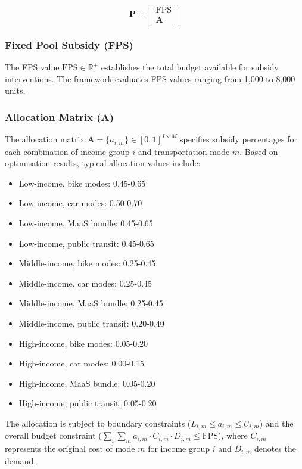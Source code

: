 \begin{equation}
\mathbf{P} = \begin{bmatrix} \text{FPS} \\ \mathbf{A} \end{bmatrix}
\end{equation}

\subsubsection{Fixed Pool Subsidy (FPS)}
The FPS value $\text{FPS} \in \mathbb{R}^+$ establishes the total budget available for subsidy interventions. The framework evaluates FPS values ranging from 1,000 to 8,000 units.

\subsubsection{Allocation Matrix \texorpdfstring{($\mathbf{A}$)}{(A)}}
The allocation matrix $\mathbf{A} = \{a_{i,m}\} \in [0,1]^{I \times M}$ specifies subsidy percentages for each combination of income group $i$ and transportation mode $m$. Based on optimisation results, typical allocation values include:

\begin{itemize}
    \item Low-income, bike modes: 0.45-0.65
    \item Low-income, car modes: 0.50-0.70
    \item Low-income, MaaS bundle: 0.45-0.65
    \item Low-income, public transit: 0.45-0.65
    \item Middle-income, bike modes: 0.25-0.45
    \item Middle-income, car modes: 0.25-0.45
    \item Middle-income, MaaS bundle: 0.25-0.45
    \item Middle-income, public transit: 0.20-0.40
    \item High-income, bike modes: 0.05-0.20
    \item High-income, car modes: 0.00-0.15
    \item High-income, MaaS bundle: 0.05-0.20
    \item High-income, public transit: 0.05-0.20
\end{itemize}

The allocation is subject to boundary constraints ($L_{i,m} \leq a_{i,m} \leq U_{i,m}$) and the overall budget constraint ($\sum_{i}\sum_{m}a_{i,m} \cdot C_{i,m} \cdot D_{i,m} \leq \text{FPS}$), where $C_{i,m}$ represents the original cost of mode $m$ for income group $i$ and $D_{i,m}$ denotes the demand.

